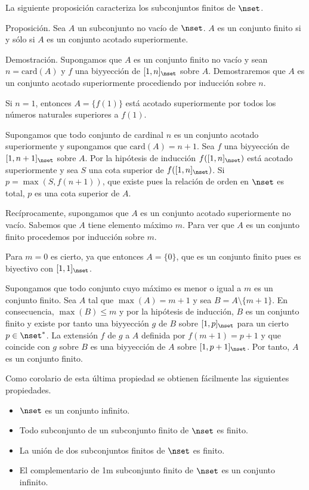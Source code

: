 La siguiente proposición caracteriza los subconjuntos finitos de $\nset$.

Proposición. Sea $A$ un subconjunto no vacío de $\nset$. $A$ es un conjunto
finito si y sólo si $A$ es un conjunto acotado superiormente.

Demostración. Supongamos que $A$ es un conjunto finito no vacío y sean $n =
\text{card}(A)$ y $f$ una biyyección de $[1, n]_{\nset}$ sobre $A$.
Demostraremos que $A$ es un conjunto acotado superiormente procediendo por
inducción sobre $n$.

Si $n = 1$, entonces $A = \{f(1)\}$ está acotado superiormente por todos los
números naturales superiores a $f(1)$.

Supongamos que todo conjunto de cardinal $n$ es un conjunto acotado
superiormente y supongamos que $\text{card}(A) = n + 1$. Sea $f$ una
biyyección de $[1, n + 1]_{\nset}$ sobre $A$. Por la hipótesis de inducción
$f([1, n]_{\nset})$ está acotado superiormente y sea $S$ una cota superior
de $f([1, n]_{\nset})$. Si $p = \max(S, f(n + 1))$, que existe pues la
relación de orden en $\nset$ es total, $p$ es una cota superior de $A$.

Recíprocamente, supongamos que $A$ es un conjunto acotado superiormente no
vacío. Sabemos que $A$ tiene elemento máximo $m$. Para ver que $A$ es un
conjunto finito procedemos por inducción sobre $m$.

Para $m = 0$ es cierto, ya que entonces $A = \{0\}$, que es un conjunto
finito pues es biyectivo con $[1, 1]_{\nset}$.

Supongamos que todo conjunto cuyo máximo es menor o igual a $m$ es un
conjunto finito. Sea $A$ tal que $\max(A) = m + 1$ y sea $B = A \setminus
\{m + 1\}$. En consecuencia, $\max(B) \leq m$ y por la hipótesis de
inducción, $B$ es un conjunto finito y existe por tanto una biyyección $g$
de $B$ sobre $[1, p]_{\nset}$ para un cierto $p \in \nset^*$. La extensión
$f$ de $g$ a $A$ definida por $f(m + 1) = p + 1$ y que coincide con $g$
sobre $B$ es una biyyección de $A$ sobre $[1, p + 1]_{\nset}$. Por tanto,
$A$ es un conjunto finito.

Como corolario de esta última propiedad se obtienen fácilmente las
siguientes propiedades.

\begin{itemize}
  \item $\nset$ es un conjunto infinito.
  \item Todo subconjunto de un subconjunto finito de $\nset$ es finito.
  \item La unión de dos subconjuntos finitos de $\nset$ es finito.
  \item El complementario de 1m subconjunto finito de $\nset$ es un conjunto
    infinito.
\end{itemize}

